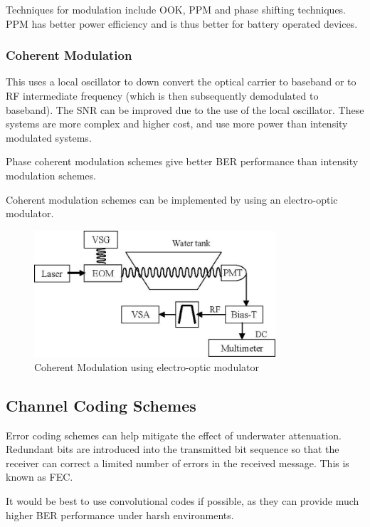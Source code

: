 Techniques for modulation include \ac{OOK}, \ac{PPM} and phase shifting
techniques. \ac{PPM} has better power efficiency and is thus better for
battery operated devices.

\subsubsection{Coherent Modulation}
This uses a local oscillator to down convert the optical carrier to baseband
or to \ac{RF} intermediate frequency (which is then subsequently demodulated
to baseband). The \ac{SNR} can be improved due to the use of the local
oscillator. These systems are more complex and higher cost, and use more power
than intensity modulated systems.

Phase coherent modulation schemes give better \ac{BER} performance than
intensity modulation schemes.

Coherent modulation schemes can be implemented by using an electro-optic
modulator.

\begin{figure}[H]
  \includegraphics[width=0.8\textwidth]{coherent-source.jpg}
  \caption{Coherent Modulation using electro-optic modulator
	   \cite{cochenour_mullen_laux_2007}}
  \label{fig:boat1}
\end{figure}

\subsection{Channel Coding Schemes}
Error coding schemes can help mitigate the effect of underwater attenuation.
Redundant bits are introduced into the transmitted bit sequence so that the
receiver can correct a limited number of errors in the received message.
This is known as \ac{FEC}.

It would be best to use convolutional codes if possible, as they can provide
much higher \ac{BER} performance under harsh environments.

